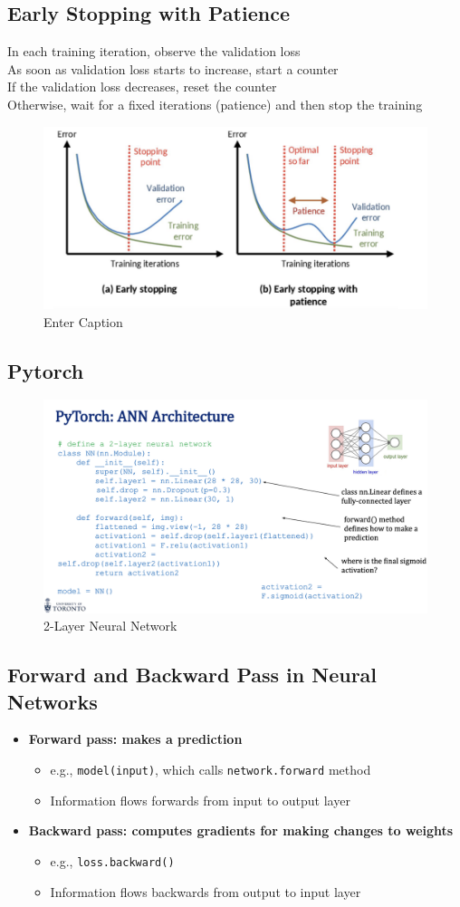 \documentclass[11pt, english]{article}
\begin{document}
\subsection{Early Stopping with Patience}
In each training iteration, observe the validation loss\\
As soon as validation loss starts to increase, start a counter\\
If the validation loss decreases, reset the counter\\
Otherwise, wait for a fixed iterations (patience) and then stop the training
\begin{figure}
    \centering
    \includegraphics[width=0.5\linewidth]{Screenshot 2025-01-22 at 3.41.54 PM.png}
    \caption{Enter Caption}
    \label{fig:enter-label}
\end{figure}
\subsection{Pytorch}
\begin{figure}[H]
    \centering
    \includegraphics[width=0.5\linewidth]{Screenshot 2025-01-22 at 3.58.15 PM.png}
    \caption{2-Layer Neural Network}
    \label{fig:enter-label}
\end{figure}
\subsection{Forward and Backward Pass in Neural Networks}
\begin{itemize}
    \item \textbf{Forward pass: makes a prediction}
    \begin{itemize}[label=\(\circ\)]
        \item e.g., \texttt{model(input)}, which calls \texttt{network.forward} method
        \item Information flows forwards from input to output layer
    \end{itemize}
    \item \textbf{Backward pass: computes gradients for making changes to weights}
    \begin{itemize}[label=\(\circ\)]
        \item e.g., \texttt{loss.backward()}
        \item Information flows backwards from output to input layer
    \end{itemize}
\end{itemize}
\end{document}
